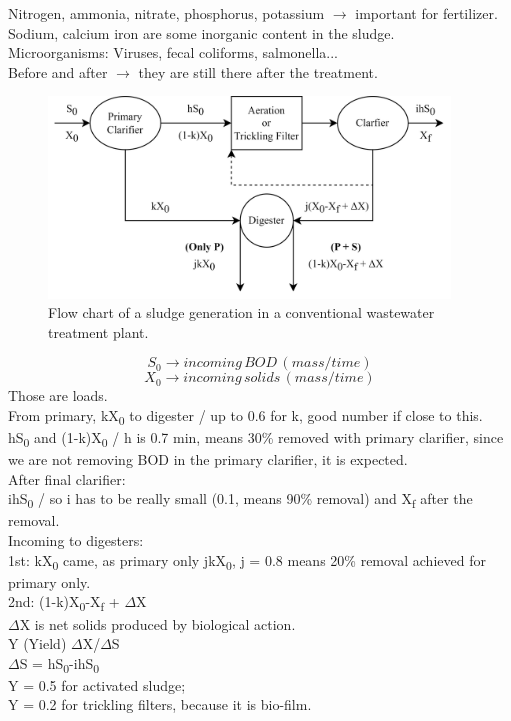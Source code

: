 \documentclass[12pt]{article}
\begin{document}
Nitrogen, ammonia, nitrate, phosphorus, potassium $\rightarrow$ important for fertilizer.\\
Sodium, calcium iron are some inorganic content in the sludge.\\
Microorganisms: Viruses, fecal coliforms, salmonella...\\
Before and after $\rightarrow$ they are still there after the treatment.
\begin{figure}[ht]
    \centering
    \includegraphics[width=0.95\textwidth]{SludgeQuantities.png}
    \caption{Flow chart of a sludge generation in a conventional wastewater treatment plant.}
    \label{fig:sludge}
\end{figure}
\[S_0 \rightarrow incoming\,BOD\,(mass/time)\]
\[X_0 \rightarrow incoming\,solids\,(mass/time)\]
Those are loads.\\
From primary, kX\textsubscript{0} to digester / up to 0.6 for k, good number if close to this.\\
hS\textsubscript{0} and (1-k)X\textsubscript{0} / h is 0.7 min, means 30\% removed with primary clarifier, since we are not removing BOD in the primary clarifier, it is expected.\\
After final clarifier:\\
ihS\textsubscript{0} / so i has to be really small (0.1, means 90\% removal) and X\textsubscript{f} after the removal.\\
Incoming to digesters:\\
1st: kX\textsubscript{0} came, as primary only jkX\textsubscript{0}, j = 0.8 means 20\% removal achieved for primary only.\\
2nd: (1-k)X\textsubscript{0}-X\textsubscript{f} + $\Delta$X\\
$\Delta$X is net solids produced by biological action.\\
Y (Yield) $\Delta$X/$\Delta$S\\
$\Delta$S = hS\textsubscript{0}-ihS\textsubscript{0}\\
Y = 0.5 for activated sludge;\\
Y = 0.2 for trickling filters, because it is bio-film.
\end{document}

